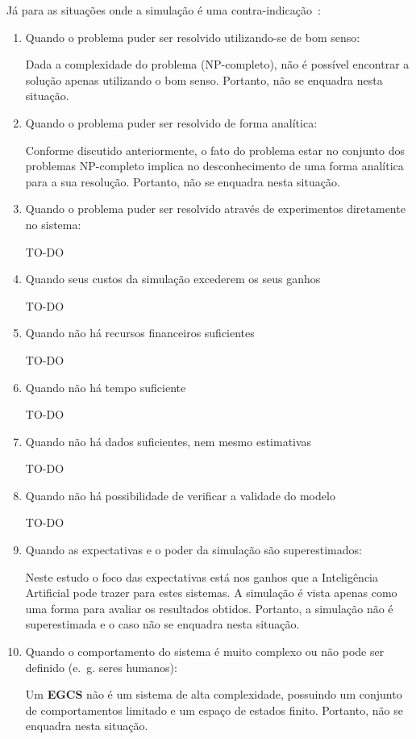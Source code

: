 Já para as situações onde a simulação é uma contra-indicação~\cite{Banks}:

\begin{enumerate}
\item Quando o problema puder ser resolvido utilizando-se de bom senso:

Dada a complexidade do problema (NP-completo), não é possível encontrar a
solução apenas utilizando o bom senso. Portanto, não se enquadra nesta situação.

\item Quando o problema puder ser resolvido de forma analítica:

Conforme discutido anteriormente, o fato do problema estar no conjunto dos
problemas NP-completo implica no desconhecimento de uma forma analítica para a
sua resolução. Portanto, não se enquadra nesta situação.

\item Quando o problema puder ser resolvido através de experimentos diretamente
      no sistema:

      TO-DO %

\item Quando seus custos da simulação excederem os seus ganhos

      TO-DO %

\item Quando não há recursos financeiros suficientes

      TO-DO %

\item Quando não há tempo suficiente

      TO-DO %

\item Quando não há dados suficientes, nem mesmo estimativas

      TO-DO %

\item Quando não há possibilidade de verificar a validade do modelo

      TO-DO %

\item Quando as expectativas e o poder da simulação são superestimados:

Neste estudo o foco das expectativas está nos ganhos que a Inteligência
Artificial pode trazer para estes sistemas. A simulação é vista apenas como uma
forma para avaliar os resultados obtidos. Portanto, a simulação não é
superestimada e o caso não se enquadra nesta situação.

\item Quando o comportamento do sistema é muito complexo ou não pode ser
      definido (e.~g. seres humanos):

Um \textbf{EGCS} não é um sistema de alta complexidade, possuindo um conjunto de
comportamentos limitado e um espaço de estados finito. Portanto, não se enquadra
nesta situação.


\end{enumerate}

